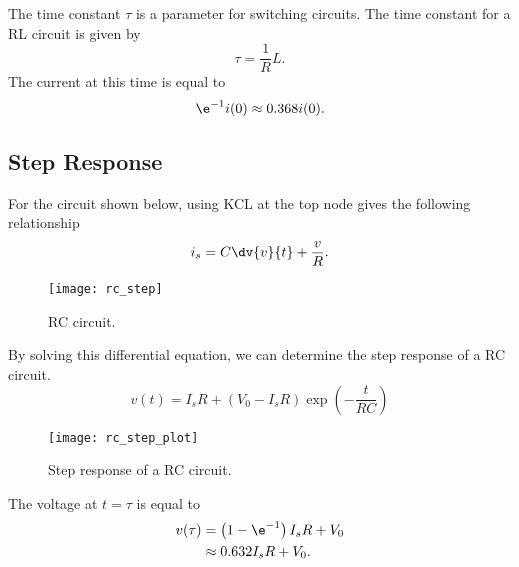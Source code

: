\documentclass{article}
\begin{document}
\begin{definition}
    The time constant $\tau$ is a parameter for switching circuits. The time constant for a RL circuit is given by
    \begin{equation*}
        \tau = \frac{1}{R}L.
    \end{equation*}
    The current at this time is equal to
    \begin{equation*}
        \e^{-1}i(0) \approx 0.368i(0).
    \end{equation*}
\end{definition}
\subsection{Step Response}
\begin{definition}
    For the circuit shown below, using KCL at the top node gives the following relationship
    \begin{equation*}
        i_s = C\dv{v}{t} + \frac{v}{R}.
    \end{equation*}
    \begin{figure}[H]
        \centering
        \texttt{[image: rc\_step]}
        \caption{RC circuit.}
    \end{figure}
    By solving this differential equation, we can determine the step response of a
    RC circuit.
    \begin{equation*}
        v(t) = I_s R + \left(V_0 - I_s R\right) \exp{\left( -\frac{t}{RC} \right)}
    \end{equation*}
    \begin{figure}[H]
        \centering
        \texttt{[image: rc\_step\_plot]}
        \caption{Step response of a RC circuit.}
    \end{figure}
    The voltage at $t = \tau$ is equal to
    \begin{align*}
        v(\tau) & = \left(1 - \e^{-1}\right)I_s R + V_0 \\
                & \approx 0.632I_s R + V_0.
    \end{align*}
\end{definition}
\end{document}

